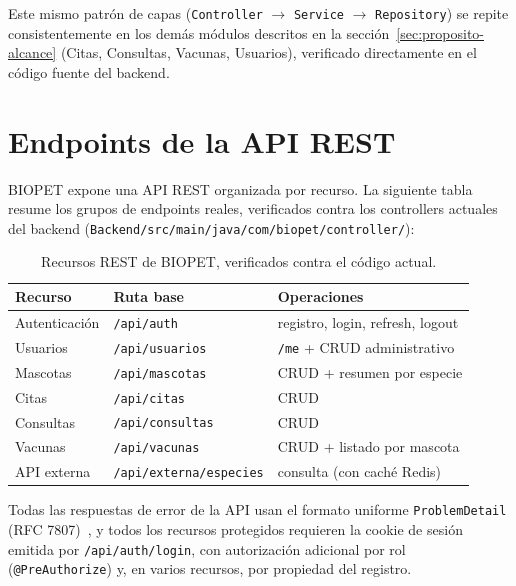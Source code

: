 
Este mismo patr\'on de capas (\texttt{Controller} $\to$ \texttt{Service}
$\to$ \texttt{Repository}) se repite consistentemente en los dem\'as
m\'odulos descritos en la secci\'on~\ref{sec:proposito-alcance} (Citas,
Consultas, Vacunas, Usuarios), verificado directamente en el c\'odigo
fuente del backend.

\section{Endpoints de la API REST}
\label{sec:endpoints-rest}

BIOPET expone una API REST organizada por recurso. La siguiente tabla
resume los grupos de endpoints reales, verificados contra los controllers
actuales del backend (\texttt{Backend/src/main/java/com/biopet/controller/}):

\begin{table}[H]
  \centering
  \small
  \caption{Recursos REST de BIOPET, verificados contra el c\'odigo actual.}
  \label{tab:recursos-rest}
  \begin{tabular}{@{}lll@{}}
    \toprule
    Recurso & Ruta base & Operaciones \\
    \midrule
    Autenticaci\'on & \texttt{/api/auth} & registro, login, refresh, logout \\
    Usuarios & \texttt{/api/usuarios} & \texttt{/me} + CRUD administrativo \\
    Mascotas & \texttt{/api/mascotas} & CRUD + resumen por especie \\
    Citas & \texttt{/api/citas} & CRUD \\
    Consultas & \texttt{/api/consultas} & CRUD \\
    Vacunas & \texttt{/api/vacunas} & CRUD + listado por mascota \\
    API externa & \texttt{/api/externa/especies} & consulta (con cach\'e Redis) \\
    \bottomrule
  \end{tabular}
\end{table}

Todas las respuestas de error de la API usan el formato uniforme
\texttt{ProblemDetail} (RFC 7807)~\parencite{rfc7807}, y todos los recursos
protegidos requieren la cookie de sesi\'on emitida por
\texttt{/api/auth/login}, con autorizaci\'on adicional por rol
(\texttt{@PreAuthorize}) y, en varios recursos, por propiedad del registro.

